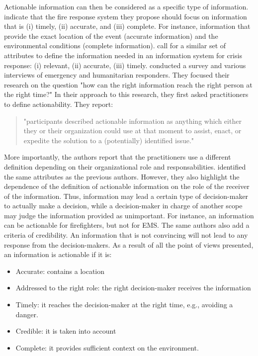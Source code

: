 Actionable information can then be considered as a specific type of information.
\textcite{yangDesignPrinciplesIntegrated2012} indicate that the fire response system they propose should focus on information that is (i) timely, (ii) accurate, and (iii) complete.
For instance, information that provide the exact location of the event (accurate information) and the environmental conditions (complete information).
\textcite{comesBringingStructureDisaster2015} call for a similar set of attributes to define the information needed in an information system for crisis response: (i) relevant, (ii) accurate, (iii) timely.
\textcite{zadeSituationalAwarenessActionability2018} conducted a survey and various interviews of emergency and humanitarian responders.
They focused their research on the question "how can the right information reach the right person at the right time?"
In their approach to this research, they first asked practitioners to define actionability.
They report:
\blockquote{"participants described actionable information as anything which either they or their organization could use at that moment to assist, enact, or expedite the solution to a (potentially) identified issue."}
More importantly, the authors report that the practitioners use a different definition depending on their organizational role and responsabilities.
\citeauthor{zadeSituationalAwarenessActionability2018} identified the same attributes as the previous authors.
However, they also highlight the dependence of the definition of actionable information on the role of the receiver of the information.
Thus, information may lead a certain type of decision-maker to actually make a decision, while a decision-maker in charge of another scope may judge the information provided as unimportant.
For instance, an information can be actionable for firefighters, but not for EMS.
The same authors also add a criteria of credibility.
An information that is not convincing will not lead to any response from the decision-makers.
As a result of all the point of views presented, an information is actionable if it is:

\begin{itemize}
    \item Accurate: contains a location
    \item Addressed to the right role: the right decision-maker receives the information
    \item Timely: it reaches the decision-maker at the right time, e.g., avoiding a danger.
    \item Credible: it is taken into account
    \item Complete: it provides sufficient context on the environment.
\end{itemize}

